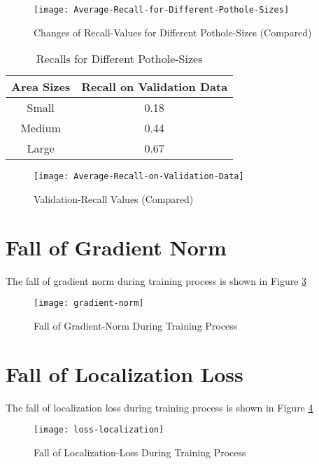             \begin{figure}[ht]
                \centering
                \texttt{[image: Average-Recall-for-Different-Pothole-Sizes]}
                \caption{Changes of Recall-Values for Different Pothole-Sizes (Compared)}
                \label{fig:recall_sizes}
            \end{figure}
            
            \begin{table}
                \centering
                \begin{tabular}{|c||c|} \hline 
                     Area Sizes  &  Recall on Validation Data \\\hline\hline
                     Small  &  0.18 \\\hline
                     Medium  &  0.44 \\\hline
                     Large  &  0.67 \\\hline
                \end{tabular}
                \caption{Recalls for Different Pothole-Sizes}
                \label{tab:recall_sizes}
            \end{table}
            
            \begin{figure}
                \centering
                \texttt{[image: Average-Recall-on-Validation-Data]}
                \caption{Validation-Recall Values (Compared)}
                \label{fig:recalls}
            \end{figure}
            
    \clearpage
    \section{Fall of Gradient Norm}
        The fall of gradient norm during training process is shown in Figure \ref{fig:gradient_norm}
        \begin{figure}[h]
            \centering
            \texttt{[image: gradient-norm]}
            \caption{Fall of Gradient-Norm During Training Process}
            \label{fig:gradient_norm}
        \end{figure}
        
    \section{Fall of Localization Loss}
        The fall of localization loss during training process is shown in Figure \ref{fig:loss_loc}
        \begin{figure}[h]
            \centering
            \texttt{[image: loss-localization]}
            \caption{Fall of Localization-Loss During Training Process}
            \label{fig:loss_loc}
        \end{figure}
        
